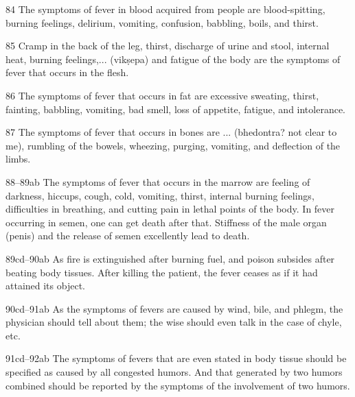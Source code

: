 \begin{translation}
    \item[84]  The symptoms of fever in blood acquired from people are
    blood-spitting, burning feelings, delirium, vomiting, confusion,
    babbling, boils, and thirst.
    
    \item[85]  Cramp in the back of the leg, thirst, discharge of urine and stool,
    internal heat, burning feelings,... (vikṣepa) and fatigue of the body
    are the symptoms of fever that occurs in the flesh.
    
    
    \item[86]  The symptoms of fever that occurs in fat are excessive sweating,
    thirst, fainting, babbling, vomiting, bad smell, loss of appetite,
    fatigue, and intolerance.
    
    \item[87]  The symptoms of fever that occurs in bones are ... (bhedontra? not
    clear to me), rumbling of the bowels, wheezing, purging, vomiting, and
    deflection of the limbs.
    
    
   \item[88--89ab]  The symptoms of fever that occurs in the marrow are feeling 
of
    darkness, hiccups, cough, cold, vomiting, thirst, internal burning
    feelings, difficulties in breathing, and cutting
    pain in lethal points of the body. In fever occurring in semen, one can
    get death after that. Stiffness of the
    male organ (penis) and the release of semen excellently lead to 
    death.
    
    \item[89cd--90ab]  As fire is extinguished after burning fuel, and poison
    subsides after beating body tissues. After killing the patient, the
    fever ceases as if it had attained its object.
    
    \item[90cd--91ab]  As the symptoms of fevers are caused by wind, bile, and
    phlegm, the physician should tell about them; the wise should even talk
    in the case of chyle, etc.
    
    
    \item[91cd--92ab]  The symptoms of fevers that are even stated in body 
tissue
    should be specified as caused by all congested humors. And that
    generated by two humors combined should be reported by the symptoms of
    the involvement of two humors.
    

\end{translation}
